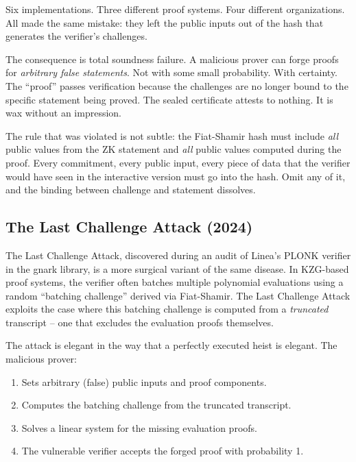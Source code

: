 \documentclass[
  11pt,
  openany]{report}
\providecommand{\tightlist}{%
  \setlength{\itemsep}{0pt}\setlength{\parskip}{0pt}}
\begin{document}
Six implementations. Three different proof systems. Four different
organizations. All made the same mistake: they left the public inputs out of the
hash that generates the verifier's challenges.

The consequence is total soundness failure. A malicious prover can forge proofs
for \emph{arbitrary false statements}. Not with some small probability. With
certainty. The ``proof'' passes verification because the challenges are no
longer bound to the specific statement being proved. The sealed certificate
attests to nothing. It is wax without an impression.

The rule that was violated is not subtle: the Fiat-Shamir hash must include
\emph{all} public values from the ZK statement and \emph{all} public values
computed during the proof. Every commitment, every public input, every piece of
data that the verifier would have seen in the interactive version must go into
the hash. Omit any of it, and the binding between challenge and statement
dissolves.

\subsection{The Last Challenge Attack
(2024)}\label{the-last-challenge-attack-2024}

The Last Challenge Attack, discovered during an audit of Linea's PLONK verifier
in the gnark library, is a more surgical variant of the same disease. In
KZG-based proof systems, the verifier often batches multiple polynomial
evaluations using a random ``batching challenge'' derived via Fiat-Shamir. The
Last Challenge Attack exploits the case where this batching challenge is
computed from a \emph{truncated} transcript -- one that excludes the evaluation
proofs themselves.

The attack is elegant in the way that a perfectly executed heist is elegant. The
malicious prover:

\begin{enumerate}
\def\labelenumi{\arabic{enumi}.}
\tightlist
\item
  Sets arbitrary (false) public inputs and proof components.
\item
  Computes the batching challenge from the truncated transcript.
\item
  Solves a linear system for the missing evaluation proofs.
\item
  The vulnerable verifier accepts the forged proof with probability 1.
\end{enumerate}
\end{document}
